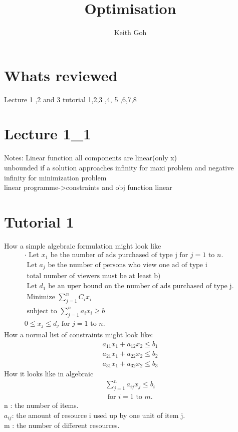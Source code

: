 \documentclass{article}
\title{Optimisation}
\author{Keith Goh}
\begin{document}
\maketitle

\section{Whats reviewed}
Lecture 1 ,2 and 3
tutorial 1,2,3 ,4, 5 ,6,7,8
\section{Lecture 1\_1}
Notes:
Linear function all components are linear(only x)\\
unbounded if a solution approaches infinity for maxi problem and negative infinity for minimization problem\\
linear programme->constraints and obj function linear
\section{Tutorial 1}
How a simple algebraic formulation might look like
$$
\begin{array} { l } { \cdot \text { Let } x _ { 1 } \text { be the number of ads purchased of type j for } j = 1 \text { to } n . } \\ { \text { Let } a _ { j } \text { be the number of persons who view one ad of type i } } \\ { \text { total number of viewers must be at least b) } } \\ { \text { Let } d _ { 1 } \text { be an uper bound on the number of ads purchased of type j. } } \\ { \text { Minimize } \sum _ { j = 1 } ^ { n } C _ { i } x _ { i } } \\ { \text { subject to } \sum _ { j = 1 } ^ { n } a _ { i } x _ { i } \geq b } \\ { 0 \leq x _ { j } \leq d _ { j } \text { for } j = 1 \text { to } n . } \end{array}
$$
How a normal list of constraints might look like:
$$
\begin{array} { l } { a _ { 11 } x _ { 1 } + a _ { 12 } x _ { 2 } \leq b _ { 1 } } \\ { a _ { 21 } x _ { 1 } + a _ { 22 } x _ { 2 } \leq b _ { 2 } } \\ { a _ { 31 } x _ { 1 } + a _ { 32 } x _ { 2 } \leq b _ { 3 } } \end{array}
$$
How it looks like in algebraic
$$
\begin{array} { l } { \sum _ { j = 1 } ^ { n } a _ { i j } x _ { j } \leq b _ { i } } \\ { \text { for } i = 1 \text { to } m . } \end{array}
$$
n  :	the number of items.\\
$a_{ij}$: the amount of resource i used up by one unit of item j.\\
m : 	the number of different resources.\\
\end{document}
